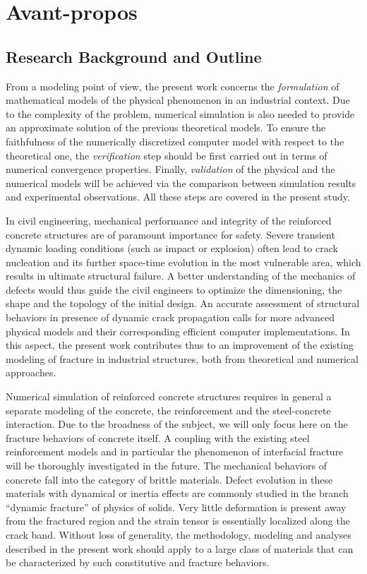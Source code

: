 \chapter{Avant-propos}

\section*{Research Background and Outline}
From a modeling point of view, the present work concerns the \emph{formulation} of mathematical models of the physical phenomenon in an industrial context. Due to the complexity of the problem, numerical simulation is also needed to provide an approximate solution of the previous theoretical models. To ensure the faithfulness of the numerically discretized computer model with respect to the theoretical one, the \emph{verification} step should be first carried out in terms of numerical convergence properties. Finally, \emph{validation} of the physical and the numerical models will be achieved via the comparison between simulation results and experimental observations. All these steps are covered in the present study.

In civil engineering, mechanical performance and integrity of the reinforced concrete structures are of paramount importance for safety. Severe transient dynamic loading conditions (such as impact or explosion) often lead to crack nucleation and its further space-time evolution in the most vulnerable area, which results in ultimate structural failure. A better understanding of the mechanics of defects would thus guide the civil engineers to optimize the dimensioning, the shape and the topology of the initial design. An accurate assessment of structural behaviors in presence of dynamic crack propagation calls for more advanced physical models and their corresponding efficient computer implementations. In this aspect, the present work contributes thus to an improvement of the existing modeling of fracture in industrial structures, both from theoretical and numerical approaches.

Numerical simulation of reinforced concrete structures requires in general a separate modeling of the concrete, the reinforcement and the steel-concrete interaction. Due to the broadness of the subject, we will only focus here on the fracture behaviors of concrete itself. A coupling with the existing steel reinforcement models and in particular the phenomenon of interfacial fracture will be thoroughly investigated in the future. The mechanical behaviors of concrete fall into the category of brittle materials. Defect evolution in these materials with dynamical or inertia effects are commonly studied in the branch ``dynamic fracture'' of physics of solids. Very little deformation is present away from the fractured region and the strain tensor is essentially localized along the crack band. Without loss of generality, the methodology, modeling and analyses described in the present work should apply to a large class of materials that can be characterized by such constitutive and fracture behaviors.


